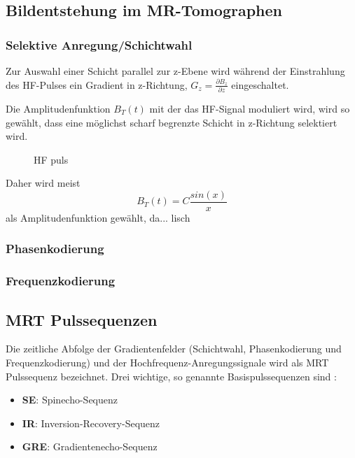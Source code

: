 \subsection{Bildentstehung im MR-Tomographen}

\subsubsection{Selektive Anregung/Schichtwahl}
Zur Auswahl einer Schicht parallel zur z-Ebene wird während der Einstrahlung des HF-Pulses ein Gradient in z-Richtung, $G_z=\frac{\partial B_z}{\partial z}$ eingeschaltet.

Die Amplitudenfunktion $B_T(t)$ mit der das HF-Signal moduliert wird, wird so gewählt, dass eine möglichst scharf begrenzte Schicht in z-Richtung selektiert wird.

\begin{figure}[H]
	\centering
	\caption[form]{HF puls}
	\label{fig:rfForm}
\end{figure}

Daher wird meist
\begin{equation}
	B_T(t)=C \frac{sin(x)}{x}
\end{equation}
als Amplitudenfunktion gewählt, da...
lisch

\subsubsection{Phasenkodierung}

\subsubsection{Frequenzkodierung}

\subsection{MRT Pulssequenzen}
Die zeitliche Abfolge der Gradientenfelder (Schichtwahl, Phasenkodierung und Frequenzkodierung) und der Hochfrequenz-Anregungssignale wird als MRT Pulssequenz bezeichnet.
Drei wichtige, so genannte Basispulssequenzen sind \cite[S. 999]{Weishaupt2014}:
\begin{itemize}
	\item \textbf{SE}: Spinecho-Sequenz
	\item \textbf{IR}: Inversion-Recovery-Sequenz
	\item \textbf{GRE}: Gradientenecho-Sequenz
\end{itemize}

